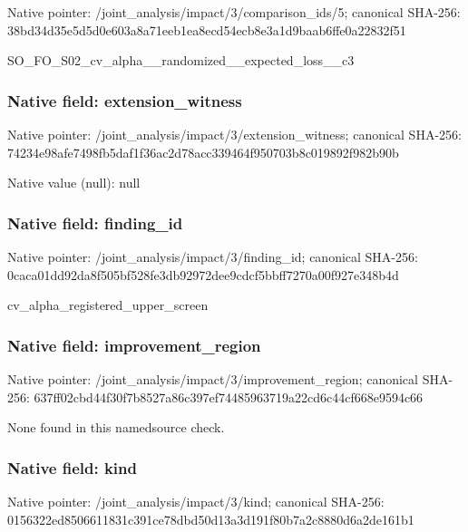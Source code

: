 \documentclass[10pt,a4paper]{article}
\begin{document}
Native pointer: /joint\_analysis/impact/3\allowbreak{}/comparison\_ids/5; canonical SHA-256: 38bd34d35e5d5d0e603a8a71\allowbreak{}eeb1ea8ecd54ecb8e3a1d9ba\allowbreak{}ab6ffe0a22832f51


SO\_FO\_S02\_cv\_alpha\_\_rand\allowbreak{}omized\_\_expected\_loss\_\_c\allowbreak{}3


\subsubsection{Native field: extension\_witness}


Native pointer: /joint\_analysis/impact/3\allowbreak{}/extension\_witness; canonical SHA-256: 74234e98afe7498fb5daf1f3\allowbreak{}6ac2d78acc339464f950703b\allowbreak{}8c019892f982b90b



Native value (null): null



\subsubsection{Native field: finding\_id}


Native pointer: /joint\_analysis/impact/3/finding\_id; canonical SHA-256: 0caca01dd92da8f505bf528f\allowbreak{}e3db92972dee9cdcf5bbff72\allowbreak{}70a00f927e348b4d


cv\_alpha\_registered\_upper\_screen


\subsubsection{Native field: improvement\_region}


Native pointer: /joint\_analysis/impact/3\allowbreak{}/improvement\_region; canonical SHA-256: 637ff02cbd44f30f7b8527a8\allowbreak{}6c397ef74485963719a22cd6\allowbreak{}c44cf668e9594c66


None found in this namedsource check.


\subsubsection{Native field: kind}


Native pointer: /joint\_analysis/impact/3/kind; canonical SHA-256: 0156322ed8506611831c391c\allowbreak{}e78dbd50d13a3d191f80b7a2\allowbreak{}c8880d6a2de161b1
\end{document}
